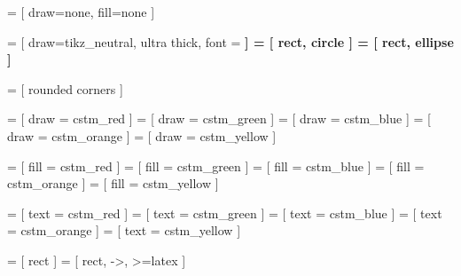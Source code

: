 
 = [
  draw=none, fill=none
]

 = [
  draw=tikz_neutral, ultra thick, font = \bf
]
 = [
  rect, circle
]
 = [
  rect, ellipse
]


 = [
  rounded corners
]

    = [ draw =    cstm_red ]
  = [ draw =  cstm_green ]
   = [ draw =   cstm_blue ]
 = [ draw = cstm_orange ]
 = [ draw = cstm_yellow ]

    = [ fill =    cstm_red ]
  = [ fill =  cstm_green ]
   = [ fill =   cstm_blue ]
 = [ fill = cstm_orange ]
 = [ fill = cstm_yellow ]

    = [ text =    cstm_red ]
  = [ text =  cstm_green ]
   = [ text =   cstm_blue ]
 = [ text = cstm_orange ]
 = [ text = cstm_yellow ]


 = [
  rect
]
 = [
  rect, ->, >=latex
]